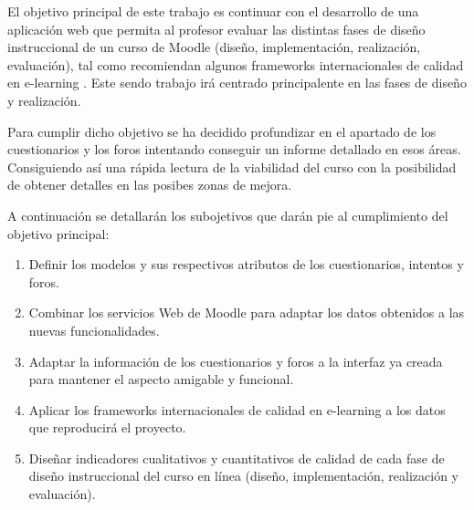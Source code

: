 
El objetivo principal de este trabajo es continuar con el desarrollo de una aplicación web que permita al profesor evaluar las distintas fases de diseño instruccional de un curso de Moodle (diseño, implementación, realización, evaluación), tal como recomiendan algunos frameworks internacionales de calidad en e-learning \cite{previotfg}. Este sendo trabajo irá centrado principalente en las fases de diseño y realización.

Para cumplir dicho objetivo se ha decidido profundizar en el apartado de los cuestionarios y los foros intentando conseguir un informe detallado en esos áreas. Consiguiendo así una rápida lectura de la viabilidad del curso con la posibilidad de obtener detalles en las posibes zonas de mejora.

A continuación se detallarán los subojetivos que darán pie al cumplimiento del objetivo principal:
\begin{enumerate}
    \item Definir los modelos y sus respectivos atributos de los cuestionarios, intentos y foros.
    \item Combinar los servicios Web de Moodle para adaptar los datos obtenidos a las nuevas funcionalidades.
    \item Adaptar la información de los cuestionarios y foros a la interfaz ya creada para mantener el aspecto amigable y funcional.
    \item Aplicar los frameworks internacionales de calidad en e-learning a los datos que reproducirá el proyecto.
    \item Diseñar indicadores cualitativos y cuantitativos de calidad de cada fase de diseño instruccional del curso en línea (diseño, implementación, realización y evaluación)\cite{previotfg}.
\end{enumerate}
